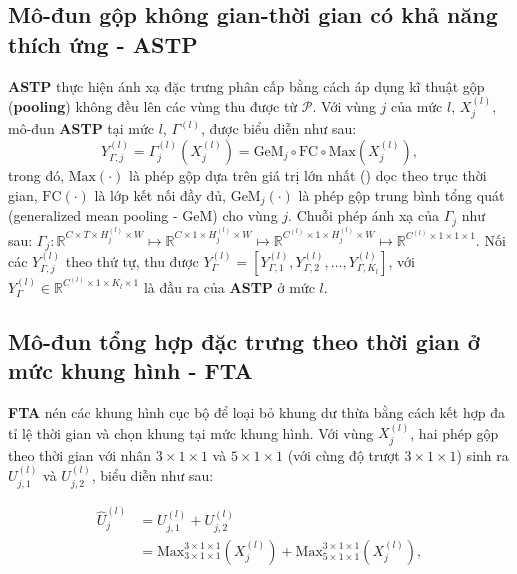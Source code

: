 \subsection{Mô-đun gộp không gian-thời gian có khả năng thích ứng - \textbf{ASTP}}

\textbf{ASTP} thực hiện ánh xạ đặc trưng phân cấp bằng cách áp dụng kĩ thuật gộp (\textbf{pooling}) không đều lên các vùng thu được từ $\mathcal{P}$. Với vùng $j$ của mức $l$, $X_j^{(l)}$, mô-đun \textbf{ASTP} tại mức $l$, $\Gamma^{(l)}$, được biểu diễn như sau:
\begin{equation}
  Y_{\Gamma,j}^{(l)}=\Gamma_j^{(l)}(X_j^{(l)})=\text{GeM}_j \circ \text{FC} \circ \text{Max}(X_j^{(l)}),
\end{equation}
trong đó, $\text{Max}(\cdot)$ là phép gộp dựa trên giá trị lớn nhất () dọc theo trục thời gian, $\text{FC}(\cdot)$ là lớp kết nối đầy đủ, $\text{GeM}_j(\cdot)$ là phép gộp trung bình tổng quát (generalized mean pooling - GeM) \cite{radenovic2018fine} cho vùng $j$. Chuỗi phép ánh xạ của $\Gamma_j$ như sau: $\Gamma_j:\mathbb{R}^{C \times T \times H_j^{(l)} \times W} \mapsto \mathbb{R}^{C \times 1 \times H_j^{(l)} \times W} \mapsto \mathbb{R}^{C^{(l)} \times 1 \times H_j^{(l)} \times W} \mapsto \mathbb{R}^{C^{(l)} \times 1 \times 1 \times 1}$. Nối các $Y_{\Gamma,j}^{(l)}$ theo thứ tự, thu được $Y_{\Gamma}^{(l)}=\left[Y_{\Gamma,1}^{(l)},Y_{\Gamma,2}^{(l)},\ldots,Y_{\Gamma,K_l}^{(l)}\right]$, với $Y_{\Gamma}^{(l)} \in \mathbb{R}^{C_{}^{(l)}\times 1 \times  K_l \times 1}$ là đầu ra của \textbf{ASTP} ở mức $l$.

\subsection{Mô-đun tổng hợp đặc trưng theo thời gian ở mức khung hình - \textbf{FTA}}

\textbf{FTA} nén các khung hình cục bộ để loại bỏ khung dư thừa bằng cách kết hợp đa tỉ lệ thời gian và chọn khung tại mức khung hình. Với vùng $X_{j}^{(l)}$, hai phép gộp theo thời gian với nhân $3 \times 1 \times 1$ và $5 \times 1 \times 1$ (với cùng độ trượt $3 \times 1 \times 1$) sinh ra $U_{j,1}^{(l)}$ và $U_{j,2}^{(l)}$, biểu diễn như sau:

\begin{equation}
  \begin{aligned}
    \hat{U}_{j}^{(l)} & =U_{j,1}^{(l)}+U_{j,2}^{(l)} \\ &=\text{Max}_{3 \times 1 \times 1}^{3\times 1 \times 1}\left(X_{j}^{(l)}\right)
    +\text{Max}_{5 \times 1 \times 1}^{3\times 1 \times 1}\left(X_{j}^{(l)}\right),
  \end{aligned}
  \label{equ:poolfeature}
\end{equation}

